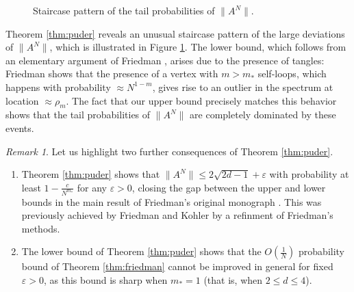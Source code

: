 \documentclass[10pt,reqno]{amsart}
\theoremstyle{definition}
\theoremstyle{remark}
\newtheorem{rem}[thm]{Remark}
\numberwithin{equation}{section}
\numberwithin{figure}{section}
\numberwithin{table}{section}
\begin{document}
\begin{figure}
\caption{Staircase pattern of the tail probabilities of 
$\|A^N\|$.\label{fig:staircase}}
\end{figure}
Theorem \ref{thm:puder} reveals an unusual staircase pattern of the large 
deviations of $\|A^N\|$, which is illustrated in Figure 
\ref{fig:staircase}. The lower bound, which follows from an elementary 
argument of Friedman \cite[Theorem 2.11]{Fri08}, arises due to the 
presence of tangles: Friedman shows that the presence of a vertex with 
$m>m_*$ self-loops, which happens with probability $\approx N^{1-m}$, 
gives rise to an outlier in the spectrum at location $\approx \rho_m$. The 
fact that our upper bound precisely matches this behavior shows that the 
tail probabilities of $\|A^N\|$ are completely dominated by these events. 

\begin{rem}
Let us highlight two further consequences of 
Theorem \ref{thm:puder}.
\vspace*{.5mm}
\begin{enumerate}[leftmargin=*,label=\arabic*.]
\addtolength{\itemsep}{.1cm}
\item Theorem \ref{thm:puder} shows that
$\|A^N\|\le 2\sqrt{2d-1}+\varepsilon$ with probability at least
$1-\frac{c}{N^{m_*}}$ for any $\varepsilon>0$, closing the gap
between the upper and lower bounds in the main result of
Friedman's original monograph \cite[p.\ 2]{Fri08}. This was
previously achieved by Friedman and Kohler \cite{FK14} 
by a refinment of Friedman's methods.
\item 
The lower bound of Theorem 
\ref{thm:puder} shows that the $O(\frac{1}{N})$ probability bound of
Theorem \ref{thm:friedman} cannot be improved in general for fixed 
$\varepsilon>0$, as this bound is sharp when $m_*=1$ (that is, when 
$2\le d\le 4$).
\end{enumerate}
\end{rem}
\end{document}
